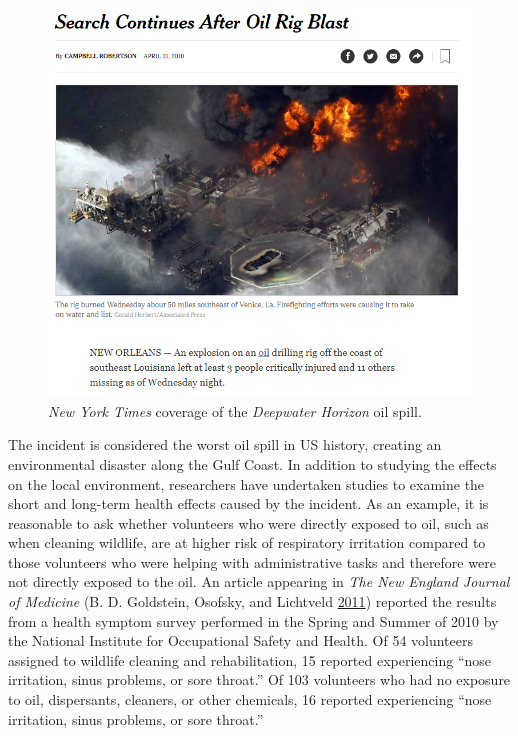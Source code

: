 \documentclass[]{book}
\theoremstyle{definition}
\theoremstyle{definition}
\theoremstyle{remark}
\begin{document}
\begin{figure}

{\centering \includegraphics[width=0.8\linewidth]{./images/Case-Deepwater-NYTclip} 

}

\caption{\emph{New York Times} coverage of the
\emph{Deepwater Horizon} oil spill.}\label{fig:casedeepwater-nytclip}
\end{figure}

The incident is considered the worst oil spill in US history, creating
an environmental disaster along the Gulf Coast. In addition to studying
the effects on the local environment, researchers have undertaken
studies to examine the short and long-term health effects caused by the
incident. As an example, it is reasonable to ask whether volunteers who
were directly exposed to oil, such as when cleaning wildlife, are at
higher risk of respiratory irritation compared to those volunteers who
were helping with administrative tasks and therefore were not directly
exposed to the oil. An article appearing in \emph{The New England
Journal of Medicine} (B. D. Goldstein, Osofsky, and Lichtveld
\protect\hyperlink{ref-Goldstein2011}{2011}) reported the results from a
health symptom survey performed in the Spring and Summer of 2010 by the
National Institute for Occupational Safety and Health. Of 54 volunteers
assigned to wildlife cleaning and rehabilitation, 15 reported
experiencing ``nose irritation, sinus problems, or sore throat.'' Of 103
volunteers who had no exposure to oil, dispersants, cleaners, or other
chemicals, 16 reported experiencing ``nose irritation, sinus problems,
or sore throat.''
\end{document}
